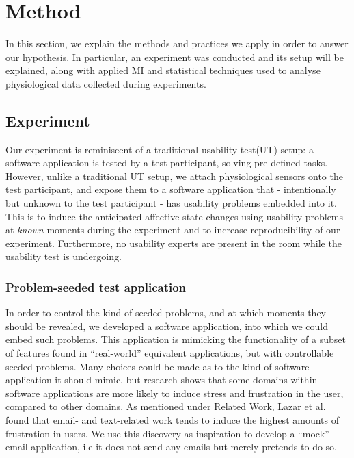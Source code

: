 \section{Method}
In this section, we explain the methods and practices we apply in order to answer our hypothesis. In particular, an
experiment was conducted and its setup will be explained, along with applied MI and statistical techniques used to
analyse physiological data collected during experiments.

\subsection{Experiment}
Our experiment is reminiscent of a traditional usability test(UT) setup: a software application is tested by a test
participant, solving pre-defined tasks. However, unlike a traditional UT setup, we attach physiological sensors
onto the test participant, and expose them to a software application that - intentionally but unknown to the test
participant - has usability problems embedded into it. This is to induce the anticipated affective state changes using
usability problems at \textit{known} moments during the experiment and to increase reproducibility of our
experiment. Furthermore, no usability experts are present in the room while the usability test is undergoing.

\subsubsection{Problem-seeded test application}
In order to control the kind of seeded problems, and at which moments they should be revealed, we developed a software
application, into which we could embed such problems. This application is mimicking the functionality of a subset of
features found in ``real-world'' equivalent applications, but with controllable seeded problems.  Many choices could be
made as to the kind of software application it should mimic, but research shows that some domains within software
applications are more likely to induce stress and frustration in the user, compared to other domains.  As mentioned
under Related Work, Lazar et al.~\cite{frustration_with_computers} found that email- and text-related work tends to
induce the highest amounts of frustration in users. We use this discovery as inspiration to develop a ``mock'' email
application, i.e it does not send any emails but merely pretends to do so.

